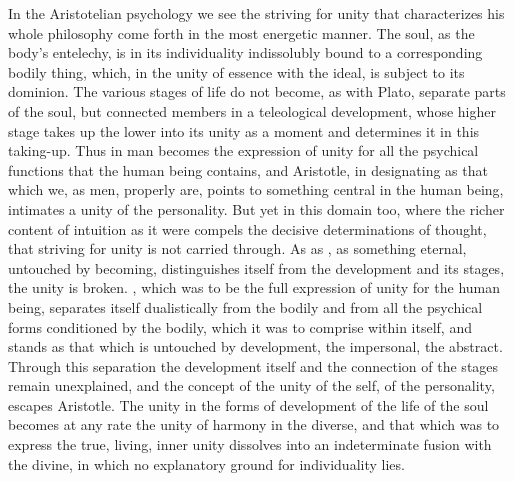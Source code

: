 In the Aristotelian psychology we see the striving for unity that characterizes his whole philosophy come forth in the most energetic manner. The soul, as the body's entelechy, is in its individuality indissolubly bound to a corresponding bodily thing, which, in the unity of essence with the ideal, is subject to its dominion. The various stages of life do not become, as with Plato, separate parts of the soul, but connected members in a teleological development, whose higher stage takes up the lower into its unity as a moment and determines it
in this taking-up. Thus in man  becomes the expression of unity for all the psychical functions that the human being contains, and Aristotle, in designating  as that which we, as men, properly are, points to something central in the human being, intimates a unity of the personality. But yet in this domain too, where the richer content of intuition as it were compels the decisive determinations of thought, that striving for unity is not carried through. As  as , as something eternal, untouched by becoming, distinguishes itself from the development and its stages, the unity is broken. , which was to be the full expression of unity for the human being, separates itself dualistically from the bodily and from all the psychical forms conditioned by the bodily, which it was to comprise within itself, and stands as that which is untouched by development, the impersonal, the abstract. Through this separation the development itself and the connection of the stages remain unexplained, and the concept of the unity of the self, of the personality, escapes Aristotle. The unity in the forms of development of the life of the soul becomes at any rate the unity of harmony in the diverse, and that which was to express the true, living, inner unity dissolves into an indeterminate fusion with the divine, in which no explanatory ground for individuality lies.

